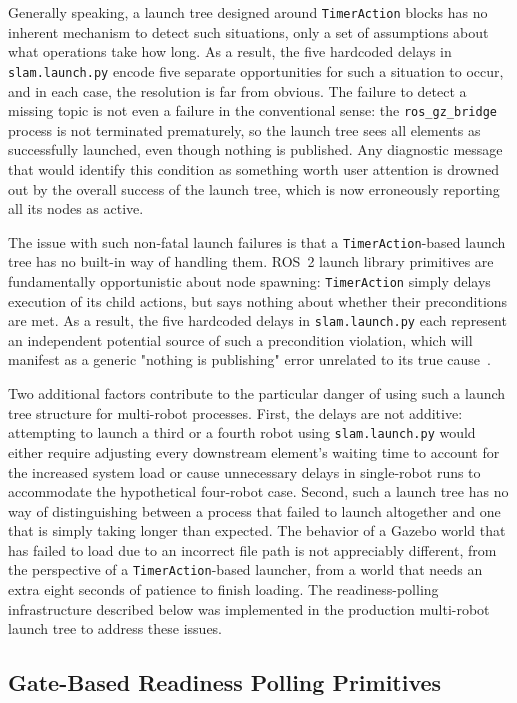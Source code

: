 Generally speaking, a launch tree designed around \texttt{TimerAction} blocks has no inherent mechanism to detect such situations, only a set of assumptions about what operations take how long. As a result, the five hardcoded delays in \texttt{slam.launch.py} encode five separate opportunities for such a situation to occur, and in each case, the resolution is far from obvious. The failure to detect a missing topic is not even a failure in the conventional sense: the \texttt{ros\_gz\_bridge} process is not terminated prematurely, so the launch tree sees all elements as successfully launched, even though nothing is published. Any diagnostic message that would identify this condition as something worth user attention is drowned out by the overall success of the launch tree, which is now erroneously reporting all its nodes as active.

The issue with such non-fatal launch failures is that a \texttt{TimerAction}-based launch tree has no built-in way of handling them. ROS~2 launch library primitives are fundamentally opportunistic about node spawning: \texttt{TimerAction} simply delays execution of its child actions, but says nothing about whether their preconditions are met. As a result, the five hardcoded delays in \texttt{slam.launch.py} each represent an independent potential source of such a precondition violation, which will manifest as a generic "nothing is publishing" error unrelated to its true cause~\cite{blass2021automatic}.

Two additional factors contribute to the particular danger of using such a launch tree structure for multi-robot processes. First, the delays are not additive: attempting to launch a third or a fourth robot using \texttt{slam.launch.py} would either require adjusting every downstream element's waiting time to account for the increased system load or cause unnecessary delays in single-robot runs to accommodate the hypothetical four-robot case. Second, such a launch tree has no way of distinguishing between a process that failed to launch altogether and one that is simply taking longer than expected. The behavior of a Gazebo world that has failed to load due to an incorrect file path is not appreciably different, from the perspective of a \texttt{TimerAction}-based launcher, from a world that needs an extra eight seconds of patience to finish loading. The readiness-polling infrastructure described below was implemented in the production multi-robot launch tree to address these issues.

\subsection{Gate-Based Readiness Polling Primitives}\label{sec:ch7_gate_primitives}

